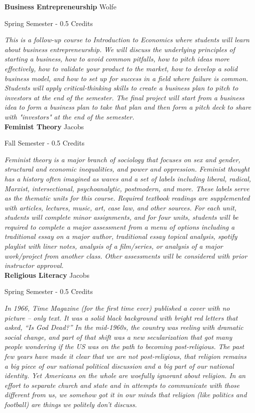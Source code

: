 \noindent\textbf{Business Entrepreneurship} \hfill Wolfe

\noindent Spring Semester - 0.5 Credits

\vspace{1mm}\emph{This is a follow-up course to Introduction to Economics where students will learn about business entrepreneurship. We will discuss the underlying principles of starting a business, how to avoid common pitfalls, how to pitch ideas more effectively, how to validate your product to the market, how to develop a solid business model, and how to set up for success in a field where failure is common. Students will apply critical-thinking skills to create a business plan to pitch to investors at the end of the semester. The final project will start from a business idea to form a business plan to take that plan and then form a pitch deck to share with "investors" at the end of the semester.}\\

\noindent\textbf{Feminist Theory} \hfill Jacobs

\noindent Fall Semester - 0.5 Credits

\vspace{1mm}\emph{Feminist theory is a major branch of sociology that focuses on sex and gender, structural and economic inequalities, and power and oppression.  Feminist thought has a history often imagined as waves and a set of labels including liberal, radical, Marxist, intersectional, psychoanalytic, postmodern, and more.  These labels serve as the thematic units for this course.  Required textbook readings are supplemented with articles, lectures, music, art, case law, and other sources.  For each unit, students will complete minor assignments, and for four units, students will be required to complete a major assessment from a menu of options including a traditional essay on a major author, traditional essay topical analysis, spotify playlist with liner notes, analysis of a film/series, or analysis of a major work/project from another class.  Other assessments will be considered with prior instructor approval.}\\

\noindent\textbf{Religious Literacy} \hfill Jacobs

\noindent Spring Semester - 0.5 Credits

\vspace{1mm}\emph{In 1966, Time Magazine (for the first time ever) published a cover with no picture – only text. It was a solid black background with bright red letters that asked, “Is God Dead?” In the mid-1960s, the country was reeling with dramatic social change, and part of that shift was a new secularization that got many people wondering if the US was on the path to becoming post-religious. The past few years have made it clear that we are not post-religious, that religion remains a big piece of our national political discussion and a big part of our national identity. Yet Americans on the whole are woefully ignorant about religion. In an effort to separate church and state and in attempts to communicate with those different from us, we somehow got it in our minds that religion (like politics and football) are things we politely don’t discuss.}\\

